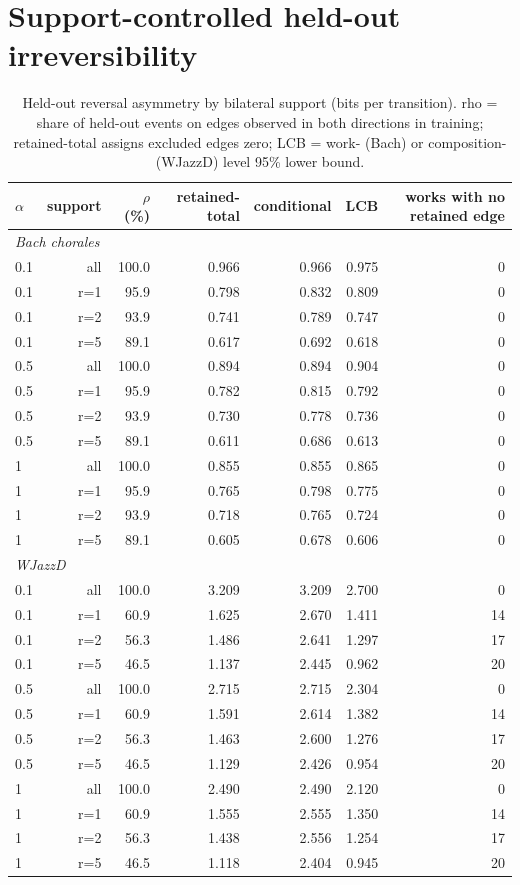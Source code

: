 \documentclass[11pt]{article}
\begin{document}
\section{Support-controlled held-out irreversibility}
\begin{table}[t]\centering\small\caption{Held-out reversal asymmetry by bilateral support (bits per transition). rho = share of held-out events on edges observed in both directions in training; retained-total assigns excluded edges zero; LCB = work- (Bach) or composition- (WJazzD) level 95\% lower bound.}\label{tab:sup}
\begin{tabular}{lrrrrrr}\toprule $\alpha$ & support & $\rho$ (\%) & retained-total & conditional & LCB & works with no retained edge \\ \midrule
\multicolumn{7}{l}{\emph{Bach chorales}} \\
0.1 & all & 100.0 & 0.966 & 0.966 & 0.975 & 0 \\
0.1 & r=1 & 95.9 & 0.798 & 0.832 & 0.809 & 0 \\
0.1 & r=2 & 93.9 & 0.741 & 0.789 & 0.747 & 0 \\
0.1 & r=5 & 89.1 & 0.617 & 0.692 & 0.618 & 0 \\
0.5 & all & 100.0 & 0.894 & 0.894 & 0.904 & 0 \\
0.5 & r=1 & 95.9 & 0.782 & 0.815 & 0.792 & 0 \\
0.5 & r=2 & 93.9 & 0.730 & 0.778 & 0.736 & 0 \\
0.5 & r=5 & 89.1 & 0.611 & 0.686 & 0.613 & 0 \\
1 & all & 100.0 & 0.855 & 0.855 & 0.865 & 0 \\
1 & r=1 & 95.9 & 0.765 & 0.798 & 0.775 & 0 \\
1 & r=2 & 93.9 & 0.718 & 0.765 & 0.724 & 0 \\
1 & r=5 & 89.1 & 0.605 & 0.678 & 0.606 & 0 \\
\multicolumn{7}{l}{\emph{WJazzD}} \\
0.1 & all & 100.0 & 3.209 & 3.209 & 2.700 & 0 \\
0.1 & r=1 & 60.9 & 1.625 & 2.670 & 1.411 & 14 \\
0.1 & r=2 & 56.3 & 1.486 & 2.641 & 1.297 & 17 \\
0.1 & r=5 & 46.5 & 1.137 & 2.445 & 0.962 & 20 \\
0.5 & all & 100.0 & 2.715 & 2.715 & 2.304 & 0 \\
0.5 & r=1 & 60.9 & 1.591 & 2.614 & 1.382 & 14 \\
0.5 & r=2 & 56.3 & 1.463 & 2.600 & 1.276 & 17 \\
0.5 & r=5 & 46.5 & 1.129 & 2.426 & 0.954 & 20 \\
1 & all & 100.0 & 2.490 & 2.490 & 2.120 & 0 \\
1 & r=1 & 60.9 & 1.555 & 2.555 & 1.350 & 14 \\
1 & r=2 & 56.3 & 1.438 & 2.556 & 1.254 & 17 \\
1 & r=5 & 46.5 & 1.118 & 2.404 & 0.945 & 20 \\
\bottomrule\end{tabular}\end{table}
\end{document}
